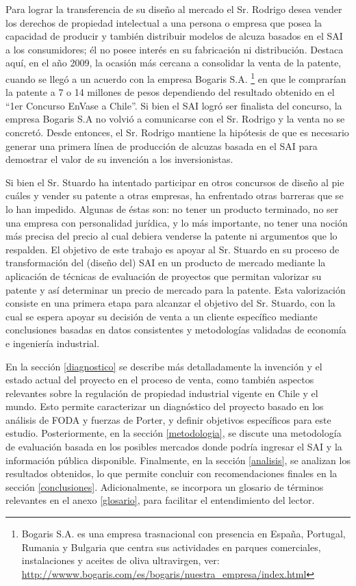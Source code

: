 Para lograr la transferencia de su diseño al mercado el Sr. Rodrigo desea vender los derechos de propiedad intelectual a una persona o empresa que posea la capacidad de producir y también distribuir modelos de alcuza basados en el SAI a los consumidores; él no posee interés en su fabricación ni distribución. Destaca aquí, en el año 2009, la ocasión más cercana a consolidar la venta de la patente, cuando se llegó a un acuerdo con la empresa Bogaris S.A.
\footnote{
Bogaris S.A. es una empresa trasnacional con presencia en España, Portugal, Rumania y Bulgaria que centra sus actividades en parques comerciales, instalaciones y aceites de oliva ultravirgen, ver:
 \url{http://wwww.bogaris.com/es/bogaris/nuestra_empresa/index.html}

 }
 en que le comprarían la patente a 7 o 14 millones de pesos dependiendo del resultado obtenido en el “1er Concurso EnVase a Chile”. Si bien el SAI logró ser finalista del concurso, la empresa Bogaris S.A no volvió a comunicarse con el Sr. Rodrigo y la venta no se concretó. Desde entonces, el Sr. Rodrigo mantiene la hipótesis de que es necesario generar una primera línea de producción de alcuzas basada en el SAI para demostrar el valor de su invención a los inversionistas.

Si bien el Sr. Stuardo ha intentado participar en otros concursos de diseño al pie cuáles y vender su patente a otras empresas, ha enfrentado otras barreras que se lo han impedido. Algunas de éstas son: no tener un producto terminado, no ser una empresa con personalidad jurídica, y lo más importante, no tener una noción más precisa del precio al cual debiera venderse la patente ni argumentos que lo respalden. El objetivo de este trabajo es apoyar al Sr. Stuardo en su proceso de transformación del (diseño del) SAI en un producto de mercado mediante la aplicación de técnicas de evaluación de proyectos que permitan valorizar su patente y así determinar un precio de mercado para la patente. Esta valorización consiste en una primera etapa para alcanzar el objetivo del Sr. Stuardo, con la cual se espera apoyar su decisión de venta a un cliente específico mediante conclusiones basadas en datos consistentes y metodologías validadas de economía e ingeniería industrial.

En la sección \ref{diagnostico} se describe más detalladamente la invención y el estado actual del proyecto en el proceso de venta, como también aspectos relevantes sobre la regulación de propiedad industrial vigente en Chile y el mundo. Esto permite caracterizar un diagnóstico del proyecto basado en los análisis de FODA y fuerzas de Porter, y definir objetivos específicos para este estudio. Posteriormente, en la sección \ref{metodologia}, se discute una metodología de evaluación basada en los posibles mercados donde podría ingresar el SAI y la información pública disponible. Finalmente, en la sección \ref{analisis}, se analizan los resultados obtenidos, lo que permite concluir con recomendaciones finales en la sección \ref{conclusiones}. Adicionalmente, se incorpora un glosario de términos relevantes en el anexo \ref{glosario}, para facilitar el entendimiento del lector.
